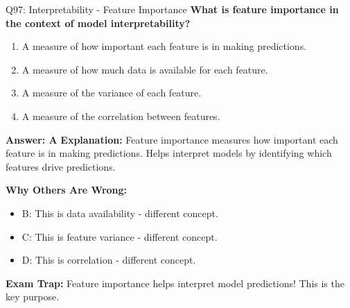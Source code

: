 \documentclass[8pt]{beamer}
\begin{document}
	\begin{frame}{Q97: Interpretability - Feature Importance}
		\fontsize{6.5}{7.5}\selectfont
		\textbf{What is feature importance in the context of model interpretability?}
		
		\begin{enumerate}
			\item A measure of how important each feature is in making predictions.
			\item A measure of how much data is available for each feature.
			\item A measure of the variance of each feature.
			\item A measure of the correlation between features.
		\end{enumerate}
		
		\vspace{0.05cm}
		\textcolor{myblue}{\textbf{Answer: A}}
		\vspace{0.05cm}
		\textcolor{myblue}{\textbf{Explanation:}} Feature importance measures how important each feature is in making predictions. Helps interpret models by identifying which features drive predictions.
		
		\vspace{0.05cm}
		\textcolor{myred}{\textbf{Why Others Are Wrong:}}
		\begin{itemize}
			\item \textcolor{myred}{B:} This is data availability - different concept.
			\item \textcolor{myred}{C:} This is feature variance - different concept.
			\item \textcolor{myred}{D:} This is correlation - different concept.
		\end{itemize}
		
		\textcolor{myred}{\textbf{Exam Trap:}} Feature importance helps \textcolor{myblue}{interpret} model predictions! This is the key purpose.
	\end{frame}
	
\end{document}
